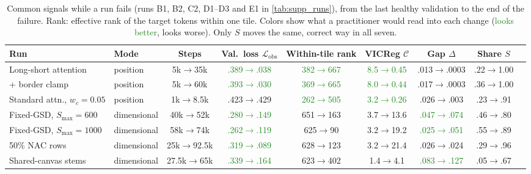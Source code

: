 \begin{table}[t]
  \centering
  \small
  \setlength{\tabcolsep}{3.6pt}
  \caption{Common signals while a run fails (runs B1, B2, C2, D1--D3 and E1 in \cref{tab:supp_runs}), from the last healthy validation to the end of the failure. Rank: effective rank of the target tokens within one tile. Colors show what a practitioner would read into each change (\textcolor{ForestGreen}{looks better}, \textcolor{BrickRed}{looks worse}). Only $S$ moves the same, correct way in all seven.}
  \label{tab:signals}
  \begin{tabular}{@{}llccccccc@{}}
    \toprule
    Run & Mode & Steps & Val.\ loss $\mathcal{L}_{\text{obs}}$ & Within-tile rank & VICReg $\mathcal{C}$ & Gap $\Delta$ & Share $S$ \\
    \midrule
    Long-short attention~\cite{zhu2021long} & position    & 5k$\to$35k    & \textcolor{ForestGreen}{.389$\to$.038} & \textcolor{ForestGreen}{382$\to$667} & \textcolor{ForestGreen}{8.5$\to$0.45} & \textcolor{BrickRed}{.013$\to$.0003} & \textcolor{BrickRed}{.22$\to$1.00} \\
    \quad + border clamp                    & position    & 5k$\to$60k    & \textcolor{ForestGreen}{.393$\to$.030} & \textcolor{ForestGreen}{369$\to$665} & \textcolor{ForestGreen}{8.0$\to$0.44} & \textcolor{BrickRed}{.017$\to$.0003} & \textcolor{BrickRed}{.36$\to$1.00} \\
    Standard attn., $w_c{=}0.05$            & position    & 1k$\to$8.5k   & .423$\to$.429                          & \textcolor{ForestGreen}{262$\to$505} & \textcolor{ForestGreen}{3.2$\to$0.26} & \textcolor{BrickRed}{.026$\to$.003}  & \textcolor{BrickRed}{.23$\to$.91} \\
    \midrule
    Fixed-GSD, $S_{\max}{=}600$             & dimensional & 40k$\to$52k   & \textcolor{ForestGreen}{.280$\to$.149} & \textcolor{BrickRed}{651$\to$163}    & \textcolor{BrickRed}{3.7$\to$13.6}    & \textcolor{ForestGreen}{.047$\to$.074} & \textcolor{BrickRed}{.46$\to$.80} \\
    Fixed-GSD, $S_{\max}{=}1000$            & dimensional & 58k$\to$74k   & \textcolor{ForestGreen}{.262$\to$.119} & \textcolor{BrickRed}{625$\to$90}     & \textcolor{BrickRed}{3.2$\to$19.2}    & \textcolor{ForestGreen}{.025$\to$.051} & \textcolor{BrickRed}{.55$\to$.89} \\
    50\% NAC rows                           & dimensional & 25k$\to$92.5k & \textcolor{ForestGreen}{.319$\to$.089} & \textcolor{BrickRed}{628$\to$123}    & \textcolor{BrickRed}{3.2$\to$21.4}    & .026$\to$.024                          & \textcolor{BrickRed}{.29$\to$.96} \\
    Shared-canvas stems                     & dimensional & 27.5k$\to$65k & \textcolor{ForestGreen}{.339$\to$.164} & \textcolor{BrickRed}{623$\to$402}    & \textcolor{BrickRed}{1.4$\to$4.1}     & \textcolor{ForestGreen}{.083$\to$.127} & \textcolor{BrickRed}{.05$\to$.67} \\
    \bottomrule
  \end{tabular}
\end{table}

